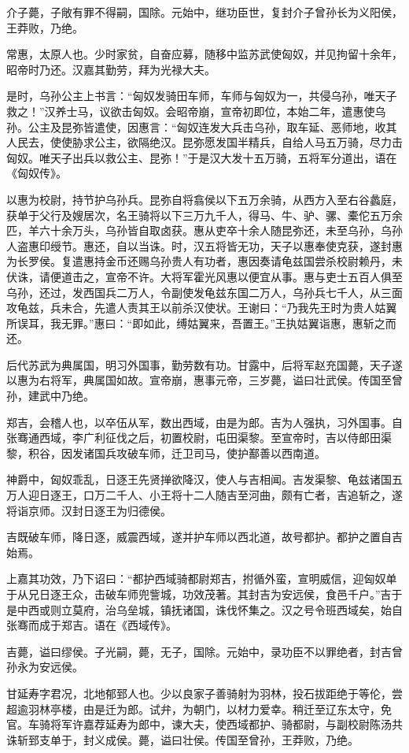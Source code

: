 \documentclass[]{article}
\begin{document}
介子薨，子敞有罪不得嗣，国除。元始中，继功臣世，复封介子曾孙长为义阳侯，王莽败，乃绝。

常惠，太原人也。少时家贫，自奋应募，随移中监苏武使匈奴，并见拘留十余年，昭帝时乃还。汉嘉其勤劳，拜为光禄大夫。

是时，乌孙公主上书言：``匈奴发骑田车师，车师与匈奴为一，共侵乌孙，唯天子救之！''汉养士马，议欲击匈奴。会昭帝崩，宣帝初即位，本始二年，遣惠使乌孙。公主及昆弥皆遣使，因惠言：``匈奴连发大兵击乌孙，取车延、恶师地，收其人民去，使使胁求公主，欲隔绝汉。昆弥愿发国半精兵，自给人马五万骑，尽力击匈奴。唯天子出兵以救公主、昆弥！''于是汉大发十五万骑，五将军分道出，语在《匈奴传》。

以惠为校尉，持节护乌孙兵。昆弥自将翕侯以下五万余骑，从西方入至右谷蠡庭，获单于父行及嫂居次，名王骑将以下三万九千人，得马、牛、驴、骡、橐佗五万余匹，羊六十余万头，乌孙皆自取卤获。惠从吏卒十余人随昆弥还，未至乌孙，乌孙人盗惠印绶节。惠还，自以当诛。时，汉五将皆无功，天子以惠奉使克获，遂封惠为长罗侯。复遣惠持金币还赐乌孙贵人有功者，惠因奏请龟兹国尝杀校尉赖丹，未伏诛，请便道击之，宣帝不许。大将军霍光风惠以便宜从事。惠与吏士五百人俱至乌孙，还过，发西国兵二万人，令副使发龟兹东国二万人，乌孙兵七千人，从三面攻龟兹，兵未合，先遣人责其王以前杀汉使状。王谢曰：``乃我先王时为贵人姑翼所误耳，我无罪。''惠曰：``即如此，缚姑翼来，吾置王。''王执姑翼诣惠，惠斩之而还。

后代苏武为典属国，明习外国事，勤劳数有功。甘露中，后将军赵充国薨，天子遂以惠为右将军，典属国如故。宣帝崩，惠事元帝，三岁薨，谥曰壮武侯。传国至曾孙，建武中乃绝。

郑吉，会稽人也，以卒伍从军，数出西域，由是为郎。吉为人强执，习外国事。自张骞通西域，李广利征伐之后，初置校尉，屯田渠黎。至宣帝时，吉以侍郎田渠黎，积谷，因发诸国兵攻破车师，迁卫司马，使护鄯善以西南道。

神爵中，匈奴乖乱，日逐王先贤掸欲降汉，使人与吉相闻。吉发渠黎、龟兹诸国五万人迎日逐王，口万二千人、小王将十二人随吉至河曲，颇有亡者，吉追斩之，遂将诣京师。汉封日逐王为归德侯。

吉既破车师，降日逐，威震西域，遂并护车师以西北道，故号都护。都护之置自吉始焉。

上嘉其功效，乃下诏曰：``都护西域骑都尉郑吉，拊循外蛮，宣明威信，迎匈奴单于从兄日逐王众，击破车师兜訾城，功效茂著。其封吉为安远侯，食邑千户。''吉于是中西或则立莫府，治乌垒城，镇抚诸国，诛伐怀集之。汉之号令班西域矣，始自张骞而成于郑吉。语在《西域传》。

吉薨，谥曰缪侯。子光嗣，薨，无子，国除。元始中，录功臣不以罪绝者，封吉曾孙永为安远侯。

甘延寿字君况，北地郁郅人也。少以良家子善骑射为羽林，投石拔距绝于等伦，尝超逾羽林亭楼，由是迁为郎。试弁，为朝门，以材力爱幸。稍迁至辽东太守，免官。车骑将军许嘉荐延寿为郎中，谏大夫，使西域都护、骑都尉，与副校尉陈汤共诛斩郅支单于，封义成侯。薨，谥曰壮侯。传国至曾孙，王莽败，乃绝。
\end{document}
